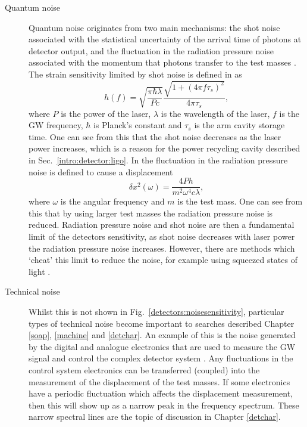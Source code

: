 \begin{description}
\item[Quantum noise] Quantum noise originates from two main mechanisms: the shot noise associated with the
statistical uncertainty of the arrival time of photons at detector output, and the fluctuation in the radiation pressure noise associated with the momentum that photons transfer to the test masses \citep{aasi2013EnhancedSensitivity}.
The strain sensitivity limited by shot noise is defined in \citep{abbott2009LIGOLaser} as
\begin{equation}
	h(f) = \sqrt{\frac{\pi \hbar \lambda}{P c}} \frac{\sqrt{1 + (4 \pi f \tau_s)^2}}{4 \pi \tau_s},
\end{equation}
where $P$ is the power of the laser, $\lambda$ is the wavelength of the laser, $f$ is the \gls{GW} frequency, $\hbar$ is Planck's constant and $\tau_s$ is the arm cavity storage time. 
One can see from this that the shot noise decreases as the laser power increases, which is a reason for the power recycling cavity described in
Sec.~\ref{intro:detector:ligo}.
In \citep{pitkin2011GravitationalWave} the fluctuation in the radiation pressure noise is defined to cause a displacement
\begin{equation}
	\delta x^2(\omega) = \frac{4 P h}{m^2 \omega^4 c \lambda},
\end{equation}
where $\omega$ is the angular frequency and $m$ is the test mass. 
One can see from this that by using larger test masses the radiation pressure noise is reduced.
Radiation pressure noise and shot noise are then a fundamental limit of the detectors sensitivity, as shot noise decreases with laser power the radiation pressure noise increases.
However, there are methods which `cheat' this limit to reduce the noise, for example using squeezed states of light \citep{aasi2013EnhancedSensitivity}. 

\item[Technical noise] Whilst this is not shown
in Fig.~\ref{detectors:noisesensitivity}, particular types of technical noise
become important to searches
described Chapter \ref{soap}, \ref{machine} and \ref{detchar}. An example of this is the noise generated by the digital and analogue electronics that are used to measure the \gls{GW} signal and control the complex
detector system \citep{martynov2016SensitivityAdvanced}. Any fluctuations in the control system electronics can be transferred (coupled) into the measurement of the displacement of the test masses. 
If some electronics have a periodic fluctuation which affects the displacement
measurement, then this will show up as a narrow peak in the frequency spectrum. These narrow spectral lines are the topic of discussion in Chapter \ref{detchar}.

\end{description}

